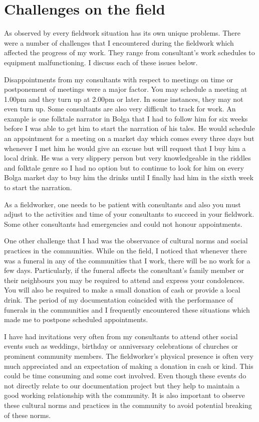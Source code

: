 \documentclass[output=paper,colorlinks,citecolor=brown]{langscibook}
\begin{document}
\section{Challenges on the field}\label{sec:atintono:7}

As observed by \citet{Bowern2015} every fieldwork situation has its own unique problems. There were a number of challenges that I encountered during the fieldwork which affected the progress of my work. They range from consultant’s work schedules to equipment malfunctioning. I discuss each of these issues below.

Disappointments from my consultants with respect to meetings on time or postponement of meetings were a major factor. You may schedule a meeting at 1.00pm and they turn up at 2.00pm or later. In some instances, they may not even turn up. Some consultants are also very difficult to track for work. An example is one folktale narrator in Bolga that I had to follow him for six weeks before I was able to get him to start the narration of his tales. He would schedule an appointment for a meeting on a market day which comes every three days but whenever I met him he would give an excuse but will request that I buy him a local drink. He was a very slippery person but very knowledgeable in the riddles and folktale genre so I had no option but to continue to look for him on every Bolga market day to buy him the drinks until I finally had him in the sixth week to start the narration. 

As a fieldworker, one needs to be patient with consultants and also you must adjust to the activities and time of your consultants to succeed in your fieldwork. Some other consultants had emergencies and could not honour appointments.

One other challenge that I had was the observance of cultural norms and social practices in the communities. While on the field, I noticed that whenever there was a funeral in any of the communities that I work, there will be no work for a few days. Particularly, if the funeral affects the consultant’s family member or their neighbours you may be required to attend and express your condolences. You will also be required to make a small donation of cash or provide a local drink. The period of my documentation coincided with the performance of funerals in the communities and I frequently encountered these situations which made me to postpone scheduled appointments. 

I have had invitations very often from my consultants to attend other social events such as weddings, birthday or anniversary celebrations of churches or prominent community members. The fieldworker’s physical presence is often very much appreciated and an expectation of making a donation in cash or kind. This could be time consuming and some cost involved. Even though these events do not directly relate to our documentation project but they help to maintain a good working relationship with the community. It is also important to observe these cultural norms and practices in the community to avoid potential breaking of these norms.  
\end{document}
